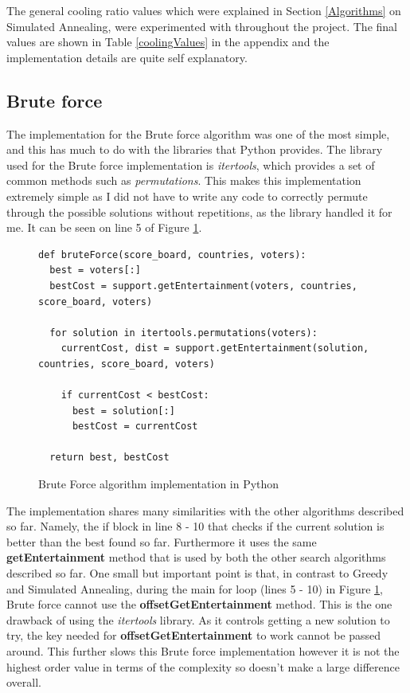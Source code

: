 \documentclass[12pt]{report}
\begin{document}
The general cooling ratio values which were explained in Section \ref{Algorithms} on Simulated Annealing, were experimented with throughout the project. The final values are shown in Table \ref{coolingValues} in the appendix and the implementation details are quite self explanatory.

\subsection{Brute force}\label{Imp-Brute}
The implementation for the Brute force algorithm was one of the most simple, and this has much to do with the libraries that Python provides. The library used for the Brute force implementation is \textit{itertools}\cite{PythonItertools}, which provides a set of common methods such as \textit{permutations}\cite{PythonPermutations}. This makes this implementation extremely simple as I did not have to write any code to correctly permute through the possible solutions without repetitions, as the library handled it for me. It can be seen on line 5 of Figure \ref{bruteForce}.

\begin{figure}[H]
\caption{Brute Force algorithm implementation in Python}
\label{bruteForce}
\begin{lstlisting}
def bruteForce(score_board, countries, voters):
  best = voters[:]
  bestCost = support.getEntertainment(voters, countries, score_board, voters)

  for solution in itertools.permutations(voters):
    currentCost, dist = support.getEntertainment(solution, countries, score_board, voters)

    if currentCost < bestCost:
      best = solution[:]
      bestCost = currentCost

  return best, bestCost
\end{lstlisting}
\end{figure}

The implementation shares many similarities with the other algorithms described so far. Namely, the if block in line 8 - 10 that checks if the current solution is better than the best found so far. Furthermore it uses the same \textbf{getEntertainment} method that is used by both the other search algorithms described so far. One small but important point is that, in contrast to Greedy and Simulated Annealing, during the main for loop (lines 5 - 10) in Figure \ref{bruteForce}, Brute force cannot use the \textbf{offsetGetEntertainment} method. This is the one drawback of using the \textit{itertools} library. As it controls getting a new solution to try, the key needed for \textbf{offsetGetEntertainment} to work cannot be passed around. This further slows this Brute force implementation however it is not the highest order value in terms of the complexity so doesn't make a large difference overall.
\end{document}

